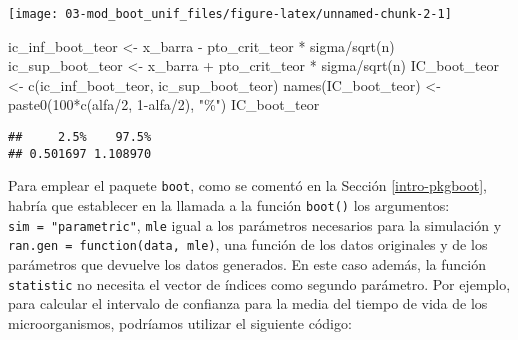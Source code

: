 \documentclass[
]{book}
\newenvironment{Shaded}{\begin{snugshade}}{\end{snugshade}}
\newcommand{\DecValTok}[1]{\textcolor[rgb]{0.00,0.00,0.81}{#1}}
\newcommand{\FunctionTok}[1]{\textcolor[rgb]{0.00,0.00,0.00}{#1}}
\newcommand{\NormalTok}[1]{#1}
\newcommand{\OtherTok}[1]{\textcolor[rgb]{0.56,0.35,0.01}{#1}}
\newcommand{\SpecialCharTok}[1]{\textcolor[rgb]{0.00,0.00,0.00}{#1}}
\newcommand{\StringTok}[1]{\textcolor[rgb]{0.31,0.60,0.02}{#1}}
\theoremstyle{break}
\theoremstyle{definition}
\theoremstyle{definition}
\theoremstyle{definition}
\theoremstyle{definition}
\theoremstyle{remark}
\begin{document}
\begin{center}\texttt{[image: 03-mod\_boot\_unif\_files/figure-latex/unnamed-chunk-2-1]} \end{center}

\begin{Shaded}
\begin{Highlighting}[]
\NormalTok{ic\_inf\_boot\_teor }\OtherTok{\textless{}{-}}\NormalTok{ x\_barra }\SpecialCharTok{{-}}\NormalTok{ pto\_crit\_teor }\SpecialCharTok{*}\NormalTok{ sigma}\SpecialCharTok{/}\FunctionTok{sqrt}\NormalTok{(n)}
\NormalTok{ic\_sup\_boot\_teor }\OtherTok{\textless{}{-}}\NormalTok{ x\_barra }\SpecialCharTok{+}\NormalTok{ pto\_crit\_teor }\SpecialCharTok{*}\NormalTok{ sigma}\SpecialCharTok{/}\FunctionTok{sqrt}\NormalTok{(n)}
\NormalTok{IC\_boot\_teor }\OtherTok{\textless{}{-}} \FunctionTok{c}\NormalTok{(ic\_inf\_boot\_teor, ic\_sup\_boot\_teor)}
\FunctionTok{names}\NormalTok{(IC\_boot\_teor) }\OtherTok{\textless{}{-}} \FunctionTok{paste0}\NormalTok{(}\DecValTok{100}\SpecialCharTok{*}\FunctionTok{c}\NormalTok{(alfa}\SpecialCharTok{/}\DecValTok{2}\NormalTok{, }\DecValTok{1}\SpecialCharTok{{-}}\NormalTok{alfa}\SpecialCharTok{/}\DecValTok{2}\NormalTok{), }\StringTok{"\%"}\NormalTok{)}
\NormalTok{IC\_boot\_teor}
\end{Highlighting}
\end{Shaded}

\begin{verbatim}
##     2.5%    97.5% 
## 0.501697 1.108970
\end{verbatim}

Para emplear el paquete \texttt{boot}, como se comentó en la Sección
\ref{intro-pkgboot}, habría que establecer en la llamada a la
función \texttt{boot()} los argumentos: \texttt{sim\ =\ "parametric"},
\texttt{mle} igual a los parámetros necesarios para la simulación y
\texttt{ran.gen\ =\ function(data,\ mle)}, una función de los datos originales
y de los parámetros que devuelve los datos generados.
En este caso además, la función \texttt{statistic} no necesita el vector
de índices como segundo parámetro.
Por ejemplo, para calcular el intervalo de confianza para la media del
tiempo de vida de los microorganismos, podríamos utilizar el siguiente código:
\end{document}
